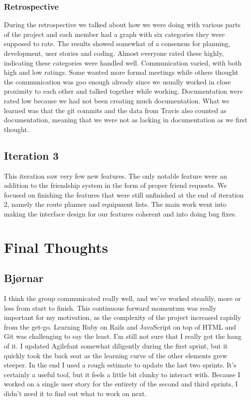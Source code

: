 \documentclass[a4paper]{article}
\begin{document}
\subsubsection{Retrospective}
During the retrospective we talked about how we were doing with various parts of the project and each member had a graph with six categories they were supposed to rate. The results showed somewhat of a consensus for planning, development, user stories and coding. Almost everyone rated these highly, indicating these categories were handled well. Communication varied, with both high and low ratings. Some wanted more formal meetings while others thought the communication was goo enough already since we usually worked in close proximity to each other and talked together while working. Documentation were rated low because we had not been creating much documentation. What we learned was that the git commits and the data from Travis also counted as documentation, meaning that we were not as lacking in documentation as we first thought.

\subsection{Iteration 3}
This iteration saw very few new features. The only notable feature were an addition to the friendship system in the form of proper friend requests. We focused on finishing the features that were still unfinished at the end of iteration 2, namely the route planner and equipment lists. The main work went into making the interface design for our features coherent and into doing bug fixes.


\section{Final Thoughts}

\subsection{Bjørnar}
I think the group communicated really well, and we've worked steadily, more or less from start to finish. This continuous forward momentum was really important for my motivation, as the complexity of the project increased rapidly from the get-go. Learning Ruby on Rails and JavaScript on top of HTML and Git was challenging to say the least. I'm still not sure that I really got the hang of it. I updated Agilefant somewhat diligently during the first sprint, but it quickly took the back seat as the learning curve of the other elements grew steeper. In the end I used a rough estimate to update the last two sprints. It's certainly a useful tool, but it feels a little bit clunky to interact with. Because I worked on a single user story for the entirety of the second and third sprints, I didn't need it to find out what to work on next.\\
\end{document}
